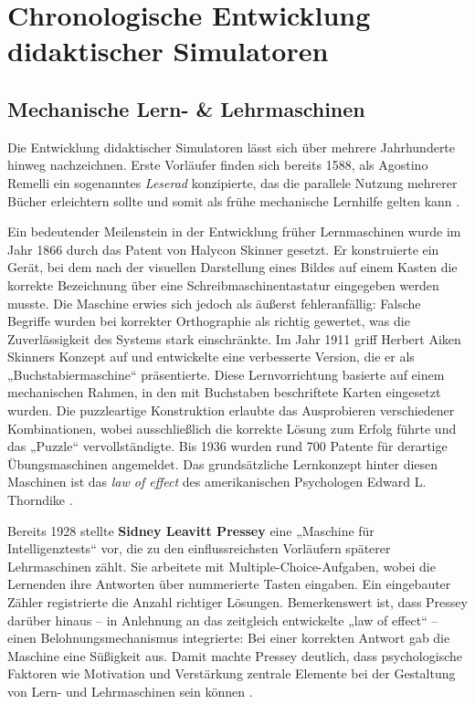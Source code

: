 \section{Chronologische Entwicklung didaktischer Simulatoren}


\subsection{Mechanische Lern- \& Lehrmaschinen}

Die Entwicklung didaktischer Simulatoren lässt sich über mehrere Jahrhunderte hinweg nachzeichnen. Erste Vorläufer finden sich bereits 1588, als Agostino Remelli ein sogenanntes \textit{Leserad} konzipierte, das die parallele Nutzung mehrerer Bücher erleichtern sollte und somit als frühe mechanische Lernhilfe gelten kann \parencite{cayetano_geschichte_2022}.

Ein bedeutender Meilenstein in der Entwicklung früher Lernmaschinen wurde im Jahr 1866 durch das Patent von Halycon Skinner gesetzt. Er konstruierte ein Gerät, bei dem nach der visuellen Darstellung eines Bildes auf einem Kasten die korrekte Bezeichnung über eine Schreibmaschinentastatur eingegeben werden musste. Die Maschine erwies sich jedoch als äußerst fehleranfällig: Falsche Begriffe wurden bei korrekter Orthographie als richtig gewertet, was die Zuverlässigkeit des Systems stark einschränkte. Im Jahr 1911 griff Herbert Aiken Skinners Konzept auf und entwickelte eine verbesserte Version, die er als „Buchstabiermaschine“ präsentierte. Diese Lernvorrichtung basierte auf einem mechanischen Rahmen, in den mit Buchstaben beschriftete Karten eingesetzt wurden. Die puzzleartige Konstruktion erlaubte das Ausprobieren verschiedener Kombinationen, wobei ausschließlich die korrekte Lösung zum Erfolg führte und das „Puzzle“ vervollständigte. Bis 1936 wurden rund 700 Patente für derartige Übungsmaschinen angemeldet. Das grundsätzliche Lernkonzept hinter diesen Maschinen ist das \textit{law of effect} des amerikanischen Psychologen Edward L. Thorndike \parencite[S.~3]{niegemann_kompendium_2008}.

Bereits 1928 stellte \textbf{Sidney Leavitt Pressey} eine „Maschine für Intelligenztests“ vor, die zu den einflussreichsten Vorläufern späterer Lehrmaschinen zählt. Sie arbeitete mit Multiple-Choice-Aufgaben, wobei die Lernenden ihre Antworten über nummerierte Tasten eingaben. Ein eingebauter Zähler registrierte die Anzahl richtiger Lösungen. Bemerkenswert ist, dass Pressey darüber hinaus -- in Anlehnung an das zeitgleich entwickelte „law of effect“ -- einen Belohnungsmechanismus integrierte: Bei einer korrekten Antwort gab die Maschine eine Süßigkeit aus. Damit machte Pressey deutlich, dass psychologische Faktoren wie Motivation und Verstärkung zentrale Elemente bei der Gestaltung von Lern- und Lehrmaschinen sein können \parencites[S.~705]{benjamin_history_1988}[S.~969f]{skinner_teaching_1958}.

